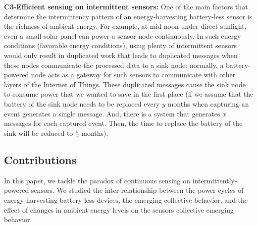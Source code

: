 \noindent\textbf{C3-Efficient sensing on intermittent sensors:} 
One of the main factors that determine the intermittency pattern of an energy-harvesting battery-less sensor is the richness of ambient energy. For example, at mid-noon under direct sunlight, even a small solar panel can power a sensor node continuously. 
In such energy conditions (favorable energy conditions), using plenty of intermittent sensors would only result in duplicated work that leads to duplicated messages when these nodes communicate the processed data to a sink node: normally, a battery-powered node acts as a gateway for such sensors to communicate with other layers of the Internet of Things. These duplicated messages cause the sink node to consume power that we wanted to save in the first place (if we assume that the battery of the sink node needs to be replaced every $y$ months when capturing an event generates a single message. And,  there is a system that generates $x$ messages for each captured event. Then, the time to replace the battery of the sink will be reduced to  $\frac{y}{x}$ months).






\subsection{Contributions}
%
In this paper, we tackle the paradox of continuous sensing on intermittently-powered sensors. 
We studied the inter-relationship between the power cycles of energy-harvesting battery-less devices, 
the emerging collective behavior, and the effect of changes in ambient energy levels on the sensors collective emerging behavior. 

